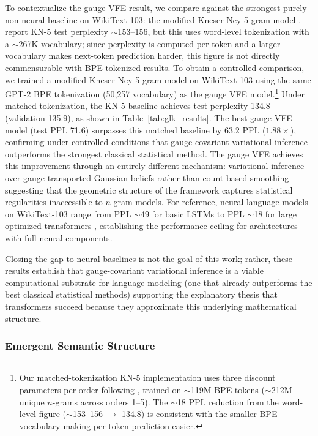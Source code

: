 \documentclass[twoside,11pt]{article}
\begin{document}
To contextualize the gauge VFE result, we compare against the strongest purely non-neural baseline on WikiText-103: the modified Kneser-Ney 5-gram model \citep{chen1998empirical}. \citet{merity2017pointer} report KN-5 test perplexity $\sim$153--156, but this uses word-level tokenization with a $\sim$267K vocabulary; since perplexity is computed per-token and a larger vocabulary makes next-token prediction harder, this figure is not directly commensurable with BPE-tokenized results. To obtain a controlled comparison, we trained a modified Kneser-Ney 5-gram model on WikiText-103 using the same GPT-2 BPE tokenization (50{,}257 vocabulary) as the gauge VFE model.\footnote{Our matched-tokenization KN-5 implementation uses three discount parameters per order following \citet{chen1998empirical}, trained on $\sim$119M BPE tokens ($\sim$212M unique $n$-grams across orders 1--5). The $\sim$18 PPL reduction from the word-level figure ($\sim$153--156 $\to$ 134.8) is consistent with the smaller BPE vocabulary making per-token prediction easier.} Under matched tokenization, the KN-5 baseline achieves test perplexity 134.8 (validation 135.9), as shown in Table~\ref{tab:glk_results}. The best gauge VFE model (test PPL 71.6) surpasses this matched baseline by 63.2 PPL ($1.88\times$), confirming under controlled conditions that gauge-covariant variational inference outperforms the strongest classical statistical method. The gauge VFE achieves this improvement through an entirely different mechanism: variational inference over gauge-transported Gaussian beliefs rather than count-based smoothing suggesting that the geometric structure of the framework captures statistical regularities inaccessible to $n$-gram models. For reference, neural language models on WikiText-103 range from PPL $\sim$49 for basic LSTMs \citep{grave2017improving} to PPL $\sim$18 for large optimized transformers \citep{dai2019transformerxl}, establishing the performance ceiling for architectures with full neural components.

Closing the gap to neural baselines is not the goal of this work; rather, these results establish that gauge-covariant variational inference is a viable computational substrate for language modeling (one that already outperforms the best classical statistical methods) supporting the explanatory thesis that transformers succeed because they approximate this underlying mathematical structure.

\subsubsection{Emergent Semantic Structure}
\end{document}
